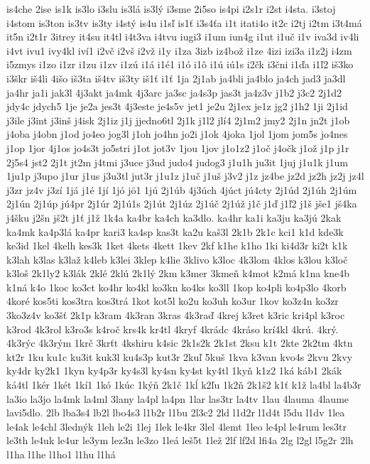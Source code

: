 {is4che
2ise
is1k
is3lo
i3slu
is3lá
is3lý
i3sme
2i5so
is4pi
i2s1r
i2st
i4sta.
i3stoj
i4stom
is3ton
is3tv
is3ty
i4stý
is4u
i1sľ
is1ť
i3s4ťa
i1t
itati4o
it2c
i2tj
i2tm
i3t4má
it5n
i2t1r
3itrey
it4su
it4tl
i4t3va
i4tvu
iugi3
i1um
iun4g
i1ut
i1uč
i1v
iva3d
iv4li
i4vt
ivu1
ivy4kl
iví1
i2vč
i2vš
i2vž
i1y
i1za
3izb
iz4bož
i1ze
4izi
izi3a
i1z2j
i4zm
i5zmys
i1zo
i1zr
i1zu
i1zv
i1zú
i1á
i1é1
i1ó
i1ô
i1ú
iú1s
i2čk
i3čni
i1ďa
i1ľ2
iš3ko
i3škr
iš4li
4išo
iš3ta
iš4tv
iš3ty
iš1ť
i1ť
1ja
2j1ab
ja4bli
ja4blo
ja4ch
jad3
ja3dl
ja4hr
ja1i
jak3l
4j3akt
ja4mk
4j3arc
ja3sc
ja4s3p
jas3t
ja4z3v
j1b2
j3c2
2j1d2
jdy4c
jdych5
1je
je2a
jes3t
4j3este
je4s5v
jet1
je2u
2j1ex
je1z
jg2
j1h2
1ji
2j1id
j3ile
j3int
j3inš
j4isk
2j1iz
j1j
jjedno6tl
2j1k
j1l2
jlí4
2j1m2
jmy2
2j1n
jn2t
j1ob
j4oba
j4obn
j1od
jo4eo
jog3l
j1oh
jo4hn
jo2i
j1ok
4joka
1jol
1jom
jom5s
jo4nes
j1op
1jor
4j1os
jo4s3t
jo5stri
j1ot
jot3v
1jou
1jov
j1o1z2
j1oč
j4očk
j1ož
j1p
j1r
2j5s4
jst2
2j1t
jt2m
j4tmi
j3uce
j3ud
judo4
judog3
j1u1h
ju3it
1juj
j1u1k
j1um
1ju1p
j3upo
j1ur
j1us
j3u3tl
jut3r
j1u1z
j1uč
j1uš
j3v2
j1z
jz4be
jz2d
jz2h
jz2j
jz4l
j3zr
jz4v
j3zí
1já
j1é
1jí
1jó
jö1
1jú
2j1úb
4j3úch
4júct
jú4cty
2j1úd
2j1úh
2j1úm
2j1ún
2j1úp
jú4pr
2j1úr
2j1ú1s
2j1út
2j1úz
2j1úč
2j1úž
j1č
j1ď
j1ľ2
j1š
jše1
jš4ka
j4šku
j2šn
jš2t
j1ť
j1ž
1k4a
ka4br
ka4ch
ka3dlo.
ka4hr
ka1i
ka3ju
ka3jú
2kak
ka4mk
ka4p3lá
ka4pr
kari3
ka4sp
kas3t
ka2u
kaš3l
2k1b
2k1c
kci1
k1d
kde3k
ke3id
1kel
4kelh
kes3k
1ket
4kets
4kett
1kev
2kf
k1he
k1ho
1ki
ki4d3r
ki2t
k1k
k3lah
k3las
k3laž
k4leb
k3lei
3klep
k4lie
3klivo
k3loc
4k3lom
4klos
k3lou
k3loč
k3loš
2k1ly2
k3lák
2klé
2klú
2k1lý
2km
k3mer
3kmeň
k4mot
k2má
k1na
kne4b
k1ná
k4o
1koc
ko3ct
ko4hr
ko4kl
ko3kn
ko4ks
ko3ll
1kop
ko4pli
ko4p3lo
4korb
4koré
kos5ti
kos3tra
kos3trá
1kot
kot5l
ko2u
ko3uh
ko3ur
1kov
ko3z4n
ko3zr
3ko3z4v
ko3šť
2k1p
k3ram
4k3ran
3kras
4k3raď
4krej
k3ret
k3ric
kri4pl
k3roc
k3rod
4k3rol
k3ro3s
k4roč
krs4k
kr4tl
4kryf
4krádc
4kráso
krí4kl
4krú.
4krý.
4k3rýc
4k3rým
1krč
3krťt
4kshiru
k4sic
2k1s2k
2k1st
2ksu
k1t
2kte
2k2tm
4ktn
kt2r
1ku
ku1c
ku3it
kuk3l
ku4s3p
kut3r
2kuľ
5kuš
1kva
k3van
kvo4s
2kvu
2kvy
ky4dr
ky2k1
1kyn
ky4p3r
ky4s3l
ky4sn
ky4st
ky4tl
1kyň
k1z2
1ká
káb1
2kák
ká4tl
1kér
1két
1kí1
1kó
1kúc
1kýň
2k1č
1kĺ
k2ľu
1k2ň
2k1š2
k1ť
k1ž
la4bl
la4b3r
la3io
la3jo
la4mk
la4ml
3lany
la4pl
la4pn
1lar
las3tr
la4tv
1lau
4lauma
4laume
lavi5dlo.
2lb
lba3s4
lb2l
lbo4s3
l1b2r
l1bu
2l3c2
2ld
l1d2r
l1d4t
l5du
l1dv
1lea
le4ak
le4chl
3lednýk
1leh
le2i
1lej
1lek
le4kr
3lel
4lemt
1leo
le4pl
le4rum
les3tr
le3th
le4uk
le4ur
le3ym
lez3n
le3zo
1leá
leš5t
1lež
2lf
lf2d
lfi4a
2lg
l2gl
l5g2r
2lh
l1ha
l1he
l1ho1
l1hu
l1há
}
